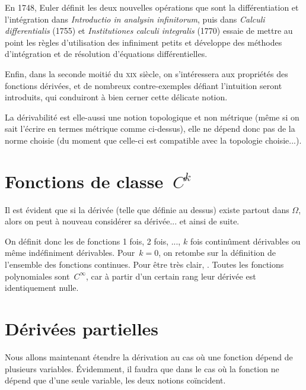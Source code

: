 \begin{histoire}
\medskip
En 1748, Euler définit les deux nouvelles opérations que sont la différentiation et l'intégration dans \emph{Introductio in analysin infinitorum}, puis dans \emph{Calculi differentialis} (1755) et \emph{Institutiones calculi integralis} (1770) essaie de mettre au point les règles d'utilisation des infiniment petits et développe des méthodes d'intégration et de résolution d'équations différentielles.

\medskip
Enfin, dans la seconde moitié du \textsc{xix} siècle, on s'intéressera aux propriétés des fonctions dérivées, et de nombreux contre-exemples défiant l'intuition seront introduits, qui conduiront à bien cerner cette délicate notion.
\end{histoire}

\medskip
La dérivabilité est elle-aussi une notion topologique et non métrique (même si on sait l'écrire en termes métrique comme ci-dessus), elle ne dépend donc pas de la norme choisie (du moment que celle-ci est compatible avec la topologie choisie...).


\medskip
\section{Fonctions de classe~$C^k$}

Il est évident que si la dérivée (telle que définie au dessus) existe partout dans $\Omega$, alors on peut à nouveau considérer sa dérivée... et ainsi de suite.

On définit donc les  de fonctions 1 fois, 2 fois, ..., $k$ fois continûment dérivables ou même indéfiniment dérivables.
\medskipvm
Pour~$k=0$, on retombe sur la définition de l'ensemble des fonctions continues.
\medskipvm
Pour être très clair, .
\medskipvm
Toutes les fonctions polynomiales sont~$C^\infty$, car à partir d'un certain rang leur dérivée est identiquement nulle.

\medskip
\section{Dérivées partielles}

Nous allons maintenant étendre la dérivation au cas où une fonction dépend de plusieurs variables. Évidemment, il faudra que dans le cas où la fonction ne dépend que d'une seule variable, les deux notions coïncident.

